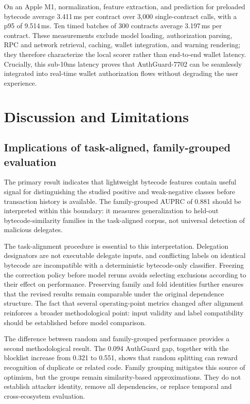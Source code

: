 \documentclass[conference]{IEEEtran}
\begin{document}
On an Apple M1, normalization, feature extraction, and prediction for preloaded bytecode average 3.411\,ms per contract over 3,000 single-contract calls, with a p95 of 9.514\,ms. Ten timed batches of 300 contracts average 3.197\,ms per contract. These measurements exclude model loading, authorization parsing, RPC and network retrieval, caching, wallet integration, and warning rendering; they therefore characterize the local scorer rather than end-to-end wallet latency. Crucially, this sub-10ms latency proves that AuthGuard-7702 can be seamlessly integrated into real-time wallet authorization flows without degrading the user experience.

\section{Discussion and Limitations}
\label{sec:discussion}

\subsection{Implications of task-aligned, family-grouped evaluation}

The primary result indicates that lightweight bytecode features contain useful signal for distinguishing the studied positive and weak-negative classes before transaction history is available. The family-grouped AUPRC of 0.881 should be interpreted within this boundary: it measures generalization to held-out bytecode-similarity families in the task-aligned corpus, not universal detection of malicious delegates.

The task-alignment procedure is essential to this interpretation. Delegation designators are not executable delegate inputs, and conflicting labels on identical bytecode are incompatible with a deterministic bytecode-only classifier. Freezing the correction policy before model reruns avoids selecting exclusions according to their effect on performance. Preserving family and fold identities further ensures that the revised results remain comparable under the original dependence structure. The fact that several operating-point metrics changed after alignment reinforces a broader methodological point: input validity and label compatibility should be established before model comparison.

The difference between random and family-grouped performance provides a second methodological result. The 0.094 AuthGuard gap, together with the blocklist increase from 0.321 to 0.551, shows that random splitting can reward recognition of duplicate or related code. Family grouping mitigates this source of optimism, but the groups remain similarity-based approximations. They do not establish attacker identity, remove all dependencies, or replace temporal and cross-ecosystem evaluation.
\end{document}
